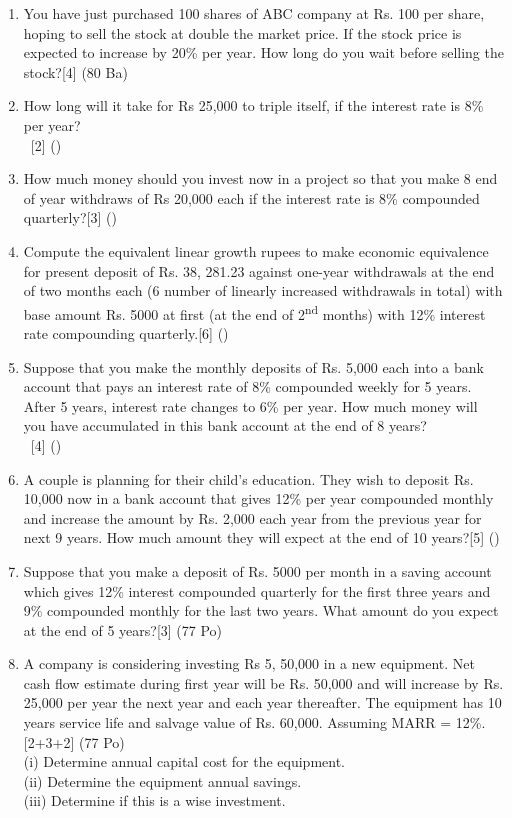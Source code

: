 \documentclass[12pt]{article}
\newcommand{\enter}{\\\textcolor{white}{1}}
\begin{document}
\begin{enumerate}
	\item You have just purchased 100 shares of ABC company at Rs. 100 per share, hoping to sell the stock at double the market price. If the stock price is expected to increase by 20\% per year. How long do you wait before selling the stock?\hfill[4] (80 Ba)

	\item How long will it take for Rs 25,000 to triple itself, if the interest rate is 8\% per year?
	\enter\hfill[2] ()

	\item How much money should you invest now in a project so that you make 8 end of year withdraws of Rs 20,000 each if the interest rate is 8\% compounded quarterly?\hfill[3] ()

	\item Compute the equivalent linear growth rupees to make economic equivalence for present deposit of Rs. 38, 281.23 against one-year withdrawals at the end of two months each (6 number of linearly increased withdrawals in total) with base amount Rs. 5000 at first (at the end of 2\textsuperscript{nd} months) with 12\% interest rate compounding quarterly.\hfill[6] ()

	\item Suppose that you make the monthly deposits of Rs. 5,000 each into a bank account that pays an interest rate of 8\% compounded weekly for 5 years. After 5 years, interest rate changes to 6\% per year. How much money will you have accumulated in this bank account at the end of 8 years?
	\enter\hfill[4] ()

	\item A couple is planning for their child's education. They wish to deposit Rs. 10,000 now in a bank account that gives 12\% per year compounded monthly and increase the amount by Rs. 2,000 each year from the previous year for next 9 years. How much amount they will expect at the end of 10 years?\hfill[5] ()

	\item Suppose that you make a deposit of Rs. 5000 per month in a saving account which gives 12\% interest compounded quarterly for the first three years and 9\% compounded monthly for the last two years. What amount do you expect at the end of 5 years?\hfill[3] (77 Po)

	\item A company is considering investing Rs 5, 50,000 in a new equipment. Net cash flow estimate during first year will be Rs. 50,000 and will increase by Rs. 25,000 per year the next year and each year thereafter. The equipment has 10 years service life and salvage value of Rs. 60,000. Assuming MARR = 12\%.\hfill[2+3+2] (77 Po)\\
	(i) Determine annual capital cost for the equipment.\\
	(ii) Determine the equipment annual savings.\\
	(iii) Determine if this is a wise investment.


\end{enumerate}
\end{document}
